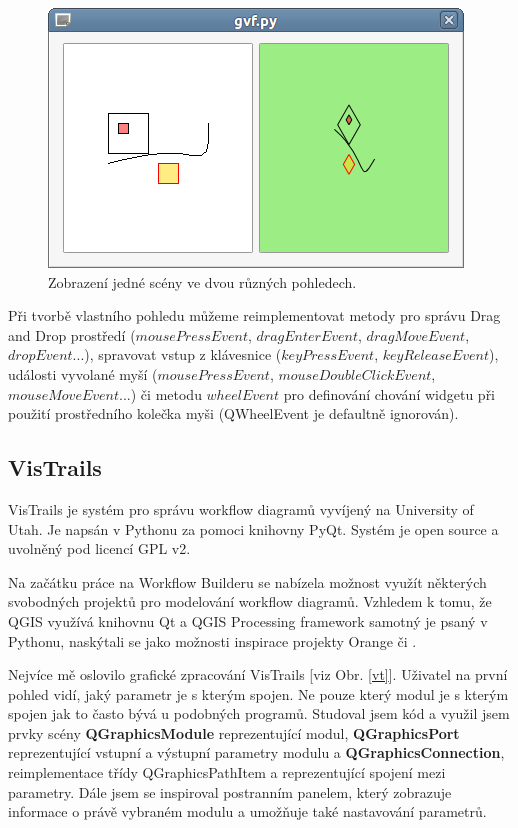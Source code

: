 \begin{figure}[h]
	\centering
	\includegraphics[scale=0.7]{pictures/qt/gsf}
	\caption{Zobrazení jedné scény ve dvou různých pohledech.}
	\label{gsf}
\end{figure}

Při tvorbě vlastního pohledu můžeme reimplementovat metody pro správu
Drag and Drop prostředí ($mousePressEvent$, $dragEnterEvent$,
$dragMoveEvent$, $dropEvent$...), spravovat vstup z klávesnice
($keyPressEvent$, $keyReleaseEvent$), události vyvolané myší
($mousePressEvent$, $mouseDoubleClickEvent$, $mouseMoveEvent$...) či
metodu $wheelEvent$ pro definování chování widgetu při použití
prostředního kolečka myši (QWheelEvent je defaultně ignorován).

\subsection{VisTrails}

VisTrails je systém pro správu workflow diagramů vyvíjený na
University of Utah. Je napsán v Pythonu za pomoci knihovny
PyQt. Systém je open source a uvolněný pod licencí GPL v2.

Na začátku práce na Workflow Builderu se nabízela možnost využít
některých svobodných projektů pro modelování workflow
diagramů. Vzhledem k tomu, že QGIS využívá knihovnu Qt a QGIS
Processing framework samotný je psaný v Pythonu, naskýtali se jako
možnosti inspirace projekty Orange či .

Nejvíce mě oslovilo grafické zpracování VisTrails [viz
Obr. \ref{vt}]. Uživatel na první pohled vidí, jaký parametr je s
kterým spojen. Ne pouze který modul je s kterým spojen jak to často
bývá u podobných programů. Studoval jsem kód a využil jsem prvky
scény \textbf{QGraphicsModule} reprezentující
modul, \textbf{QGraphicsPort} reprezentující vstupní a výstupní
parametry modulu a \textbf{QGraphicsConnection}, reimplementace třídy
QGraphicsPathItem a reprezentující spojení mezi parametry. Dále jsem
se inspiroval postranním panelem, který zobrazuje informace o právě
vybraném modulu a umožňuje také nastavování parametrů.

